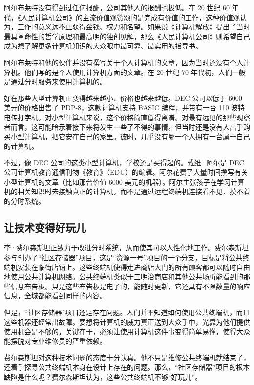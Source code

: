\documentclass[12pt,UTF8]{ctexbook}
\begin{document}
阿尔布莱特没有得到过任何报酬，公司其他人的报酬也极低。在 20 世纪 60 年代，《人民计算机公司》的主流价值观赞颂的是完成有价值的工作，这种价值观认为，工作的意义远不止获得金钱、权力和名望。如果说《计算机解放》提出了当时最具革命性的哲学原理和最高明的独创见解，那么《人民计算机公司》则希望自己成为想了解更多计算机知识的大众眼中最可靠、最实用的指导书。

阿尔布莱特和他的伙伴并没有撰写关于个人计算机的文章，因为当时还没有个人计算机。他们写的是个人使用计算机方面的文章。在 20 世纪 70 年代初，人们一般是通过分时服务来使用计算机的。

好在那些大型计算机正变得越来越小、价格也越来越低。DEC 公司以低于 6000 美元的价格出售了 PDP-8，这款计算机支持 BASIC 编程，并带有一台 110 波特电传打字机。对小型计算机来说，这个价格简直低得离谱。对最有远见的那些观察者而言，这可能暗示着接下来将发生一些了不得的事情。但当时还是没有人出手购买小型计算机，把它安在自己的家里。彼时，几乎没有哪一个人拥有一台属于自己的计算机。

不过，像 DEC 公司的这类小型计算机，学校还是买得起的。戴维·阿尔是 DEC 公司计算机教育通信刊物《教育》（EDU）的编辑。阿尔花费了大量时间撰写有关小型计算机的文章（比如那台价值 6000 美元的机器）。阿尔主张孩子在学习计算机的相关知识时去接触真正的计算机，而不是通过远程终端机连接看不见、摸不着的分时系统。





\subsection{让技术变得好玩儿}


李·费尔森斯坦正致力于改进分时系统，从而使其可以人性化地工作。费尔森斯坦参与创办了“社区存储器”项目，这是“资源一号”项目的一个分支，目标是将公共终端机安装在临街店铺上。这些终端机使得走进商店大门的所有顾客都可以随时自由地使用公共计算机网络。公共终端机类似于三明治商店和其他公共场所能看到的那些信息布告板。只是这些布告板是电子的，能随时更新，它还具有不限数量的响应信息，全城都能看到同样的内容。

但是，“社区存储器”项目还是存在问题。人们并不知道如何使用公共终端机，而且这些机器还经常出故障。要想将计算机的威力真正送到大众手中，光靠为他们提供使用机会是不够的，关键在于，必须让使用计算机这件事变得简单易懂，使得大众能摆脱对专业维修员的严重依赖。

费尔森斯坦对这种技术问题的态度十分认真。他不只是维修公共终端机就结束了，还着手探寻公共终端机本身在设计上存在的问题。那么，“社区存储器”项目的根本缺陷是什么呢？费尔森斯坦认为，这些公共终端机不够“好玩儿”。
\end{document}
